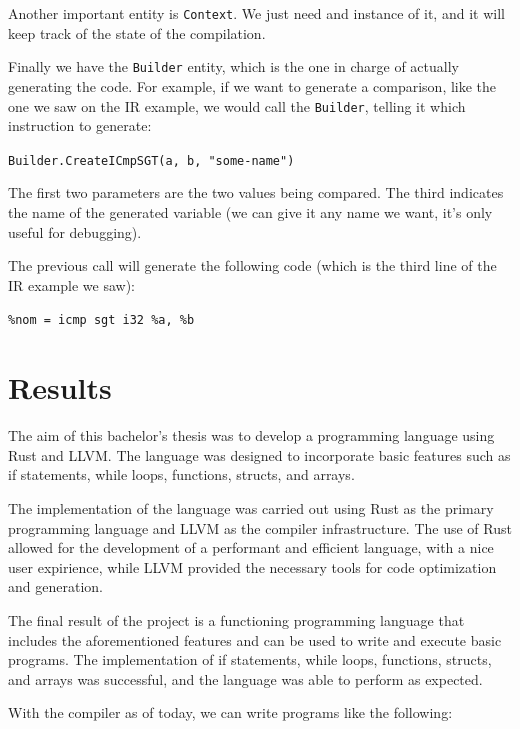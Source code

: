 ﻿\documentclass[10pt,a4paper,twocolumn,twoside]{article}
\begin{document}
Another important entity is \texttt{Context}. We just need and instance of it, 
and it will keep track of the state of the compilation.

Finally we have the \texttt{Builder} entity, which is the one in charge of 
actually generating the code. For example, if we want to generate a comparison,
like the one we saw on the IR example, we would call the \texttt{Builder}, 
telling it which instruction to generate:

\texttt{Builder.CreateICmpSGT(a, b, "some-name")}

The first two parameters are the two values being compared. The third 
indicates the name of the generated variable (we can give it any name we want,
it's only useful for debugging).

The previous call will generate the following code (which is the third line of
the IR example we saw):

\texttt{\%nom = icmp sgt i32 \%a, \%b}

\section{Results}
The aim of this bachelor's thesis was to develop a programming language using
Rust and LLVM. The language was designed to incorporate basic features such as
if statements, while loops, functions, structs, and arrays.

The implementation of the language was carried out using Rust as the primary
programming language and LLVM as the compiler infrastructure. The use of Rust
allowed for the development of a performant and efficient language, with a nice
user expirience, while LLVM provided the necessary tools for code optimization
and generation.

The final result of the project is a functioning programming language that
includes the aforementioned features and can be used to write and execute basic
programs. The implementation of if statements, while loops, functions, structs,
and arrays was successful, and the language was able to perform as expected.

With the compiler as of today, we can write programs like the following:
\end{document}

